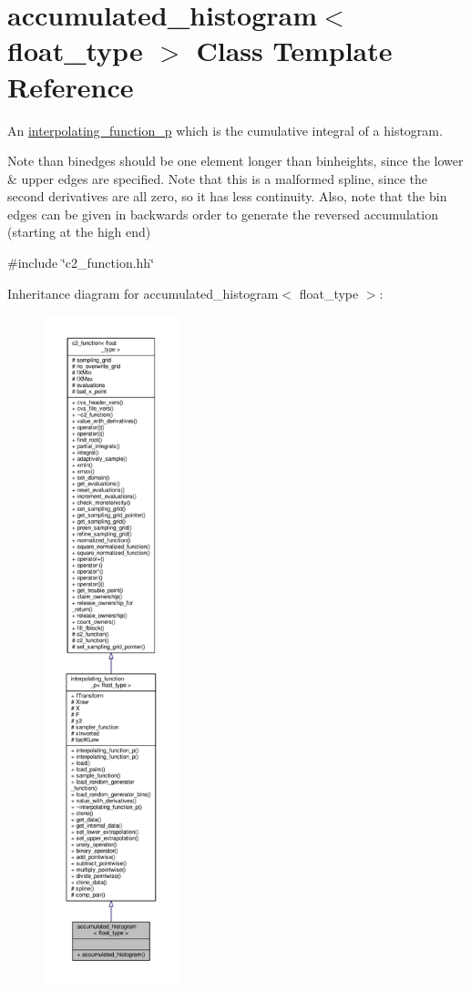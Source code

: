\hypertarget{classaccumulated__histogram}{}\section{accumulated\+\_\+histogram$<$ float\+\_\+type $>$ Class Template Reference}
\label{classaccumulated__histogram}


An \hyperlink{classinterpolating__function__p}{interpolating\+\_\+function\+\_\+p} which is the cumulative integral of a histogram.

Note than binedges should be one element longer than binheights, since the lower \& upper edges are specified. Note that this is a malformed spline, since the second derivatives are all zero, so it has less continuity. Also, note that the bin edges can be given in backwards order to generate the reversed accumulation (starting at the high end)  




{\ttfamily \#include \char`\"{}c2\+\_\+function.\+hh\char`\"{}}



Inheritance diagram for accumulated\+\_\+histogram$<$ float\+\_\+type $>$\+:
\nopagebreak
\begin{figure}[H]
\begin{center}
\leavevmode
\includegraphics[height=550pt]{classaccumulated__histogram__inherit__graph}
\end{center}
\end{figure}


